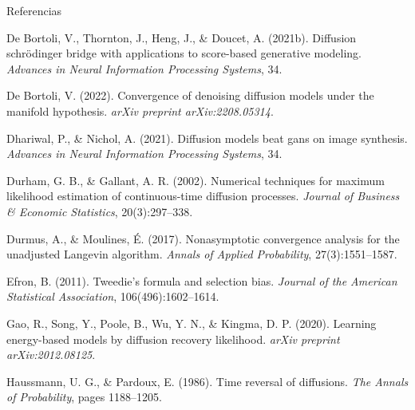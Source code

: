 \documentclass[aspectratio=169,xcolor=dvipsnames, t, spanish]{beamer}
\begin{document}
\begin{frame}{Referencias}
{\begin{thebibliography}{99}
                 De Bortoli, V., Thornton, J., Heng, J., \& Doucet, A. (2021b).
                \newblock Diffusion schrödinger bridge with applications to score-based generative modeling.
                \newblock \emph{Advances in Neural Information Processing Systems}, 34.
    
                 De Bortoli, V. (2022).
                \newblock Convergence of denoising diffusion models under the manifold hypothesis.
                \newblock \emph{arXiv preprint arXiv:2208.05314}.
    
                 Dhariwal, P., \& Nichol, A. (2021).
                \newblock Diffusion models beat gans on image synthesis.
                \newblock \emph{Advances in Neural Information Processing Systems}, 34.
    
                 Durham, G. B., \& Gallant, A. R. (2002).
                \newblock Numerical techniques for maximum likelihood estimation of continuous-time diffusion processes.
                \newblock \emph{Journal of Business \& Economic Statistics}, 20(3):297–338.
    
                 Durmus, A., \& Moulines, É. (2017).
                \newblock Nonasymptotic convergence analysis for the unadjusted Langevin algorithm.
                \newblock \emph{Annals of Applied Probability}, 27(3):1551–1587.
    
                 Efron, B. (2011).
                \newblock Tweedie's formula and selection bias.
                \newblock \emph{Journal of the American Statistical Association}, 106(496):1602–1614.
                
                 Gao, R., Song, Y., Poole, B., Wu, Y. N., \& Kingma, D. P. (2020).
                \newblock Learning energy-based models by diffusion recovery likelihood.
                \newblock \emph{arXiv preprint arXiv:2012.08125}.
                
                 Haussmann, U. G., \& Pardoux, E. (1986).
                \newblock Time reversal of diffusions.
                \newblock \emph{The Annals of Probability}, pages 1188–1205.
                

\end{thebibliography}}
\end{frame}
\end{document}
